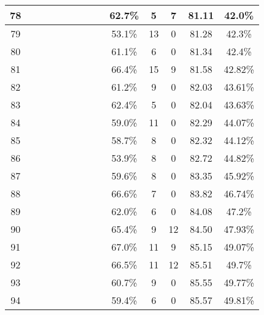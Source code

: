 \begin{longtable}{|c|c|c|c|c|c|c|c|c|c|c|c|c|c|}
78 &  \x    & \x    & \x    & \x    & \x    & \x\m  &       & \x    & 62.7\% &  5  & 7  & 81.11 & 42.0\% \\ \hline
79 &  \x    & \x    &       &       &       &       &       &       & 53.1\% &  13 & 0  & 81.28 & 42.3\% \\ \hline
80 &  \x    & \x    & \x    & \x    &       & \x    &       & \x    & 61.1\% &  6  & 0  & 81.34 & 42.4\% \\ \hline
81 &  \x    & \x    &       &       & \x\m  & \x\m  &       & \x\m  & 66.4\% &  15 & 9  & 81.58 & 42.82\% \\ \hline
82 &  \x    & \x    & \x    & \x    &       &       &       & \x\m  & 61.2\% &  9  & 0  & 82.03 & 43.61\% \\ \hline
83 &  \x    & \x    & \x    &       & \x    & \x\m  & \x    &       & 62.4\% &  5  & 0  & 82.04 & 43.63\% \\ \hline
84 &  \x    & \x    &       & \x    & \x    &       &       &       & 59.0\% &  11 & 0  & 82.29 & 44.07\% \\ \hline
85 &  \x    & \x    & \x    &       &       & \x\m  &       &       & 58.7\% &  8  & 0  & 82.32 & 44.12\% \\ \hline
86 &  \x    & \x    &       & \x    &       &       &       &       & 53.9\% &  8  & 0  & 82.72 & 44.82\% \\ \hline
87 &  \x    & \x    &       &       & \x    &       &       &       & 59.6\% &  8  & 0  & 83.35 & 45.92\% \\ \hline
88 &  \x    & \x    & \x    &       & \x\m  &       & \x    &       & 66.6\% &  7  & 0  & 83.82 & 46.74\% \\ \hline
89 &  \x    & \x    & \x    &       & \x    & \x\m  &       & \x    & 62.0\% &  6  & 0  & 84.08 & 47.2\% \\ \hline
90 &  \x    & \x    &       & \x    & \x\m  & \x\m  & \x\m  &       & 65.4\% &  9  & 12 & 84.50 & 47.93\% \\ \hline
91 &  \x    & \x    &       &       & \x\m  & \x\m  &       &       & 67.0\% &  11 & 9  & 85.15 & 49.07\% \\ \hline
92 &  \x    & \x    &       & \x    & \x\m  &       &       & \x\m  & 66.5\% &  11 & 12 & 85.51 & 49.7\% \\ \hline
93 &  \x    & \x    & \x    &       &       &       & \x    &       & 60.7\% &  9  & 0  & 85.55 & 49.77\% \\ \hline
94 &  \x    & \x    & \x    &       &       & \x    &       & \x    & 59.4\% &  6  & 0  & 85.57 & 49.81\% \\ \hline

\end{longtable}
